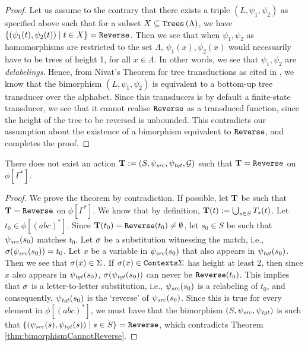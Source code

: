 \begin{proof}
Let us assume to the contrary that there exists a triple $(L, \psi_1, \psi_2)$ as specified above such that for a subset $X \subseteq \texttt{Trees}\left(\Lambda\right)$, we have $\left\{ (\psi_1(t), \psi_2(t)) \mid t \in X \right\} = \texttt{Reverse}$. Then we see that when $\psi_1, \psi_2$ as homomorphisms are restricted to the set $\Lambda$, $\psi_1(x), \psi_2(x)$ would necessarily have to be trees of height 1, for all $x \in \Lambda$. In other words, we see that $\psi_1, \psi_2$ are \emph{delabelings}. Hence, from Nivat's Theorem for tree transductions as cited in \cite{tata}, we know that the bimorphism $(L, \psi_1, \psi_2)$ is equivalent to a bottom-up tree transducer over the alphabet. Since this transducers is by default a finite-state transducer, we see that it cannot realise $\texttt{Reverse}$ as a transduced function, since the height of the tree to be reversed is unbounded. This contradicts our assumption about the existence of a bimorphism equivalent to $\texttt{Reverse}$, and completes the proof.
\end{proof}

\begin{theorem}
    There does not exist an action $\mathbf{T} := (S, \psi_{\mathit{src}}, \psi_{\mathit{tgt}}, \mathcal{G})$ such that $\mathbf{T} = \texttt{Reverse}$ on $\phi[\Gamma^*]$.
\end{theorem}

\begin{proof}
    We prove the theorem by contradiction. If possible, let $\mathbf{T}$ be such that $\mathbf{T} = \texttt{Reverse}$ on $\phi[\Gamma^*]$. We know that by definition, $\mathbf{T}(t) := \bigcup_{s \in S} T_s(t)$. Let $t_0 \in \phi[(abc)^*]$. Since $\mathbf{T}(t_0) = \texttt{Reverse}(t_0) \neq \emptyset$, let $s_0 \in S$ be such that $\psi_{\mathit{src}}(s_0)$ matches $t_0$. Let $\sigma$ be a substitution witnessing the match, i.e., $\sigma(\psi_{\mathit{src}}(s_0)) = t_0$. Let $x$ be a variable in $\psi_{\mathit{src}}(s_0)$ that also appears in $\psi_{\mathit{tgt}}(s_0)$. Then we see that $\sigma(x) \in \Sigma$. If $\sigma(x) \in \texttt{Contexts}{\Sigma}{}$ has height at least 2, then since $x$ also appears in $\psi_{\mathit{tgt}}(s_0)$, $\sigma(\psi_{\mathit{tgt}}(s_0))$ can never be $\texttt{Reverse}(t_0)$. This implies that $\sigma$ is a letter-to-letter substitution, i.e., $\psi_{\mathit{src}}(s_0)$ is a relabeling of $t_0$, and consequently, $\psi_{\mathit{tgt}}(s_0)$ is the `reverse' of $\psi_{\mathit{src}}(s_0)$. Since this is true for every element in $\phi[(abc)^*]$, we must have that the bimorphism $(S, \psi_{\mathit{src}}, \psi_{\mathit{tgt}})$ is such that $\left\{ (\psi_{\mathit{src}}(s), \psi_{\mathit{tgt}}(s)) \mid s \in S \right\} = \texttt{Reverse}$, which contradicts Theorem \ref{thm:bimorphismCannotReverse}.
\end{proof}

